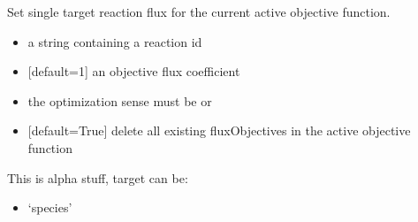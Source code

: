 \documentclass[letterpaper,10pt,english]{sphinxmanual}
\begin{document}
\begin{fulllineitems}
\begin{fulllineitems}
\begin{itemize}
\end{itemize}

\end{fulllineitems}


\begin{fulllineitems}
\label{\detokenize{modules_doc:cbmpy.CBModel.Model.setObjectiveFlux}}
\pysigstartsignatures
{}
\pysigstopsignatures
\sphinxAtStartPar
Set single target reaction flux for the current active objective function.
\begin{itemize}
\item {} 
\sphinxAtStartPar
{} a string containing a reaction id

\item {} 
\sphinxAtStartPar
{} {[}default=1{]} an objective flux coefficient

\item {} 
\sphinxAtStartPar
{} the optimization sense must be  or 

\item {} 
\sphinxAtStartPar
{} {[}default=True{]} delete all existing fluxObjectives in the active objective function

\end{itemize}

\end{fulllineitems}


\begin{fulllineitems}
\label{\detokenize{modules_doc:cbmpy.CBModel.Model.setPrefix}}
\pysigstartsignatures
{}
\pysigstopsignatures
\sphinxAtStartPar
This is alpha stuff, target can be:
\begin{itemize}
\item {} 
\sphinxAtStartPar
‘species’


\end{itemize}
\end{fulllineitems}
\end{fulllineitems}
\end{document}

